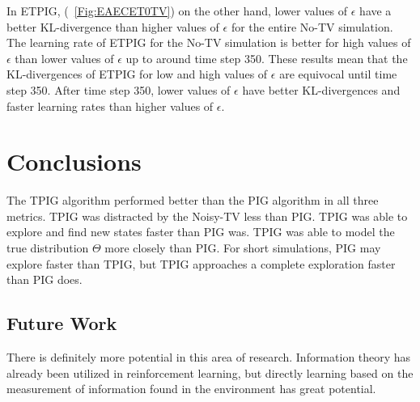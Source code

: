 \documentclass[12pt]{thesis}
\begin{document}
In ETPIG, (\figurename~\ref{Fig:EAECET0TV}) on the other hand, lower values of $\epsilon$ have a better KL-divergence than higher values of $\epsilon$ for the entire No-TV simulation. The learning rate of ETPIG for the No-TV simulation is better for high values of $\epsilon$ than lower values of $\epsilon$ up to around time step 350. These results mean that the KL-divergences of ETPIG for low and high values of $\epsilon$ are equivocal until time step 350. After time step 350, lower values of $\epsilon$ have better KL-divergences and faster learning rates than higher values of $\epsilon$.




\chapter{Conclusions}
The TPIG algorithm performed better than the PIG algorithm in all three metrics. TPIG was distracted by the Noisy-TV less than PIG. TPIG was able to explore and find new states faster than PIG was. TPIG was able to model the true distribution $\Theta$ more closely than PIG. For short simulations, PIG may explore faster than TPIG, but TPIG approaches a complete exploration faster than PIG does.
\section{Future Work}
There is definitely more potential in this area of research. Information theory has already been utilized in reinforcement learning, but directly learning based on the measurement of information found in the environment has great potential. 
\end{document}
